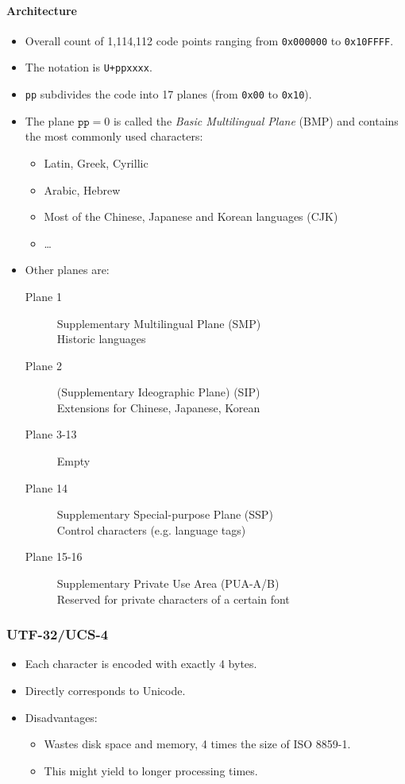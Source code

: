				\paragraph{Architecture}
					\begin{itemize}
						\item Overall count of 1,114,112 code points ranging from \texttt{0x000000} to \texttt{0x10FFFF}.
						\item The notation is \texttt{U+ppxxxx}.
						\item \texttt{pp} subdivides the code into 17 planes (from \texttt{0x00} to \texttt{0x10}).
						\item The plane \( \texttt{pp} = 0 \) is called the \textit{Basic Multilingual Plane} (BMP) and contains the most commonly used characters:
							\begin{itemize}
								\item Latin, Greek, Cyrillic
								\item Arabic, Hebrew
								\item Most of the Chinese, Japanese and Korean languages (CJK)
								\item \dots
							\end{itemize}
						\item Other planes are:
							\begin{description}
								\item[Plane 1] Supplementary Multilingual Plane (SMP) \\ Historic languages
								\item[Plane 2] (Supplementary Ideographic Plane) (SIP) \\ Extensions for Chinese, Japanese, Korean
								\item[Plane 3-13] Empty
								\item[Plane 14] Supplementary Special-purpose Plane (SSP) \\ Control characters (e.g. language tags)
								\item[Plane 15-16] Supplementary Private Use Area (PUA-A/B) \\ Reserved for private characters of a certain font
							\end{description}
					\end{itemize}

			\subsubsection{UTF-32/UCS-4} %
				\begin{itemize}
					\item Each character is encoded with exactly 4 bytes.
					\item Directly corresponds to Unicode.
					\item Disadvantages:
						\begin{itemize}
							\item Wastes disk space and memory, 4 times the size of ISO 8859-1.
							\item This might yield to longer processing times.
						\end{itemize}
				\end{itemize}

